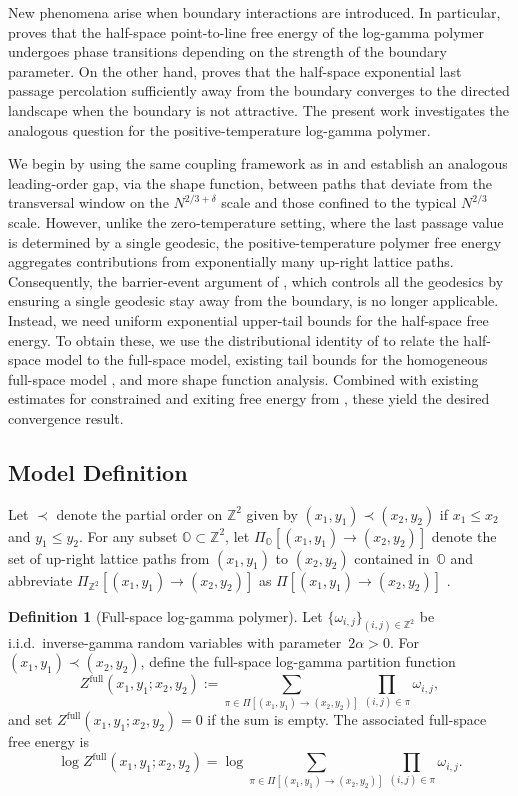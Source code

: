 \documentclass[11pt]{article}
\theoremstyle{definition}
\newtheorem{definition}[theorem]{Definition}
\newcommand{\Z}{\mathbb{Z}}
\newcommand{\OO}{\mathbb{O}}
\begin{document}
New phenomena arise when boundary interactions are introduced. In particular,  \cite{barraquand2023identity} proves that the half-space point-to-line free energy of the log-gamma polymer undergoes phase transitions depending on the strength of the boundary parameter. On the other hand, \cite{AConvergence} proves that the half-space exponential last passage percolation sufficiently away from the boundary converges to the directed landscape when the boundary is not attractive. The present work investigates the analogous question for the positive-temperature log-gamma polymer.

We begin by using the same coupling framework as in \cite{AConvergence} and establish an analogous leading-order gap, via the shape function, between paths that deviate from the transversal window on the $N^{2/3+\delta}$ scale and those confined to the typical $N^{2/3}$ scale. However, unlike the zero-temperature setting, where the last passage value is determined by a single geodesic, the positive-temperature polymer free energy aggregates contributions from exponentially many up-right lattice paths. Consequently, the barrier-event argument of \cite{AConvergence}, which controls all the geodesics by ensuring a single geodesic stay away from the boundary, is no longer applicable. Instead, we need uniform exponential upper-tail bounds for the half-space free energy. To obtain these, we use the distributional identity of \cite{barraquand2023identity} to relate the half-space model to the full-space model, existing tail bounds for the homogeneous full-space model \cite{barraquand2021fluctuations}, and more shape function analysis. Combined with existing estimates for constrained and exiting free energy from \cite{basu2024temporal}, these yield the desired convergence result.


\subsection{Model Definition}\label{sec:model}
Let $\prec$ denote the partial order on $\Z^2$ given by
$(x_1,y_1)\prec(x_2,y_2)$ if $x_1\le x_2$ and $y_1\le y_2$. For any subset $\OO \subset \Z^2$, let $\Pi_{\OO}[(x_1,y_1) \rightarrow (x_2,y_2)]$ denote the set of up-right lattice paths from $(x_1, y_1)$ to $(x_2,y_2)$ contained in~$\OO$ and abbreviate $\Pi_{\Z^2}[(x_1,y_1) \rightarrow (x_2,y_2)]$ as $\Pi[(x_1,y_1) \rightarrow (x_2,y_2)]$ .

\begin{definition}[Full-space log-gamma polymer]
Let $\{\omega_{i,j}\}_{(i,j) \in \Z^2}$ be i.i.d.\ inverse-gamma random variables with parameter~$2\alpha>0$. For $(x_1,y_1)\prec(x_2,y_2)$, define the full-space log-gamma partition function
\[
Z^{\mathrm{full}}(x_1,y_1;x_2,y_2)
:=\sum_{\pi \in \Pi[(x_1,y_1)\to(x_2,y_2)]} 
\prod_{(i,j)\in\pi} \omega_{i,j},
\]
and set $Z^{\mathrm{full}}(x_1,y_1;x_2,y_2)=0$ if the sum is empty.
The associated full-space free energy is
\[
\log Z^{\mathrm{full}}(x_1,y_1;x_2,y_2) = \log \sum_{\pi \in \Pi[(x_1,y_1)\to(x_2,y_2)]} 
\prod_{(i,j)\in\pi} \omega_{i,j}.
\]
\end{definition}
\end{document}
